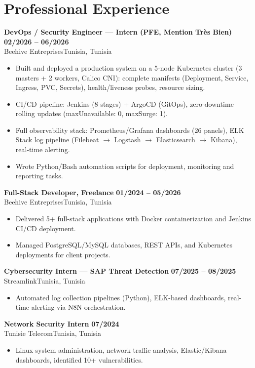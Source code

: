 \documentclass[a4paper,10pt]{article}
\newcommand{\cventry}[4]{\textbf{#1} \hfill \textbf{#4}\\[0.5pt]#2{\ifx\relax#3\relax\else, #3\fi}\par\vspace{1pt}}
\begin{document}
\section{Professional Experience}
\cventry{DevOps / Security Engineer --- Intern (PFE, Mention Très Bien)}{Beehive Entreprises}{Tunisia}{02/2026 -- 06/2026}
\begin{itemize}
  \item Built and deployed a production system on a 5-node Kubernetes cluster (3 masters + 2 workers, Calico CNI): complete manifests (Deployment, Service, Ingress, PVC, Secrets), health/liveness probes, resource sizing.
  \item CI/CD pipeline: Jenkins (8 stages) + ArgoCD (GitOps), zero-downtime rolling updates (maxUnavailable: 0, maxSurge: 1).
  \item Full observability stack: Prometheus/Grafana dashboards (26 panels), ELK Stack log pipeline (Filebeat $\to$ Logstash $\to$ Elasticsearch $\to$ Kibana), real-time alerting.
  \item Wrote Python/Bash automation scripts for deployment, monitoring and reporting tasks.
\end{itemize}
\cventry{Full-Stack Developer, Freelance}{Beehive Entreprises}{Tunisia}{01/2024 -- 05/2026}
\begin{itemize}
  \item Delivered 5+ full-stack applications with Docker containerization and Jenkins CI/CD deployment.
  \item Managed PostgreSQL/MySQL databases, REST APIs, and Kubernetes deployments for client projects.
\end{itemize}
\cventry{Cybersecurity Intern --- SAP Threat Detection}{Streamlink}{Tunisia}{07/2025 -- 08/2025}
\begin{itemize}
  \item Automated log collection pipelines (Python), ELK-based dashboards, real-time alerting via N8N orchestration.
\end{itemize}
\cventry{Network Security Intern}{Tunisie Telecom}{Tunisia}{07/2024}
\begin{itemize}
  \item Linux system administration, network traffic analysis, Elastic/Kibana dashboards, identified 10+ vulnerabilities.
\end{itemize}
\end{document}
